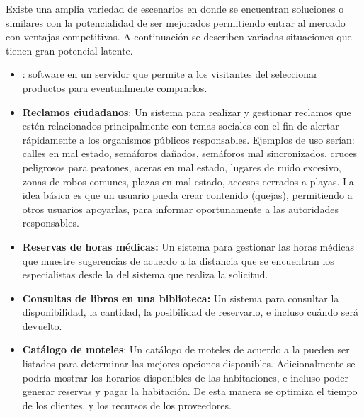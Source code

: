 
		Existe una amplia variedad de escenarios en donde se encuentran soluciones \ecommerceCOM o similares con la potencialidad de ser mejorados permitiendo entrar al mercado con ventajas competitivas. A continuación se describen variadas situaciones que tienen gran potencial latente.

		\begin{itemize}
			\item
				\textbf{\shoppingCart}: software \ecommerceCOM en un servidor \webINT que permite a los visitantes del \websiteINT seleccionar productos para eventualmente comprarlos.
			
			\item
				\textbf{Reclamos ciudadanos}: Un sistema para realizar y gestionar reclamos que estén relacionados principalmente con temas sociales con el fin de alertar rápidamente a los organismos públicos responsables. Ejemplos de uso serían: calles en mal estado, semáforos dañados, semáforos mal sincronizados, cruces peligrosos para peatones, aceras en mal estado, lugares de ruido excesivo, zonas de robos comunes, plazas en mal estado, accesos cerrados a playas. La idea básica es que un usuario pueda crear contenido (quejas), permitiendo a otros usuarios apoyarlas, para informar oportunamente a las autoridades responsables.
			
			\item 
				\textbf{Reservas de horas médicas:} Un sistema para gestionar las horas médicas que muestre sugerencias de acuerdo a la distancia que se encuentran los especialistas desde la \geoPositionCPT del sistema que realiza la solicitud. 
			
			\item
				\textbf{Consultas de libros en una biblioteca:} Un sistema para consultar la disponibilidad, la cantidad, la posibilidad de reservarlo, e incluso cuándo será devuelto.

			\item
				\textbf{Catálogo de moteles}: Un catálogo de moteles de acuerdo a la \geoPositionCPT pueden ser listados para determinar las mejores opciones disponibles. Adicionalmente se podría mostrar los horarios disponibles de las habitaciones, e incluso poder generar reservas y pagar la habitación. De esta manera se optimiza el tiempo de los clientes, y los recursos de los proveedores.
			

\end{itemize}
